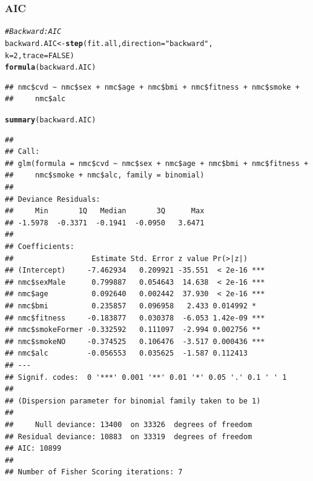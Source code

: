 \documentclass{article}\usepackage[]{graphicx}\usepackage[]{xcolor}
\makeatletter
\newcommand{\hlnum}[1]{\textcolor[rgb]{0.686,0.059,0.569}{#1}}%
\newcommand{\hlstr}[1]{\textcolor[rgb]{0.192,0.494,0.8}{#1}}%
\newcommand{\hlcom}[1]{\textcolor[rgb]{0.678,0.584,0.686}{\textit{#1}}}%
\newcommand{\hlstd}[1]{\textcolor[rgb]{0.345,0.345,0.345}{#1}}%
\newcommand{\hlkwb}[1]{\textcolor[rgb]{0.69,0.353,0.396}{#1}}%
\newcommand{\hlkwc}[1]{\textcolor[rgb]{0.333,0.667,0.333}{#1}}%
\newcommand{\hlkwd}[1]{\textcolor[rgb]{0.737,0.353,0.396}{\textbf{#1}}}%
\newenvironment{kframe}{%
 \def\at@end@of@kframe{}%
 \ifinner\ifhmode%
  \def\at@end@of@kframe{\end{minipage}}%
  \begin{minipage}{\columnwidth}%
 \fi\fi%
 \def\FrameCommand##1{\hskip\@totalleftmargin \hskip-\fboxsep
 \colorbox{shadecolor}{##1}\hskip-\fboxsep
     \hskip-\linewidth \hskip-\@totalleftmargin \hskip\columnwidth}%
 \MakeFramed {\advance\hsize-\width
   \@totalleftmargin\z@ \linewidth\hsize
   \@setminipage}}%
 {\par\unskip\endMakeFramed%
 \at@end@of@kframe}
\newenvironment{knitrout}{}{} %
\makeatother
\begin{document}
        \subsubsection{AIC}
\begin{knitrout}
\color{fgcolor}\begin{kframe}
\begin{alltt}
\hlcom{#Backward: AIC}
\hlstd{backward.AIC} \hlkwb{<-} \hlkwd{step}\hlstd{(fit.all,} \hlkwc{direction}\hlstd{=}\hlstr{"backward"}\hlstd{,}
                     \hlkwc{k}\hlstd{=}\hlnum{2}\hlstd{,} \hlkwc{trace}\hlstd{=}\hlnum{FALSE}\hlstd{)}
\hlkwd{formula}\hlstd{(backward.AIC)}
\end{alltt}
\begin{verbatim}
## nmc$cvd ~ nmc$sex + nmc$age + nmc$bmi + nmc$fitness + nmc$smoke + 
##     nmc$alc
\end{verbatim}
\begin{alltt}
\hlkwd{summary}\hlstd{(backward.AIC)}
\end{alltt}
\begin{verbatim}
## 
## Call:
## glm(formula = nmc$cvd ~ nmc$sex + nmc$age + nmc$bmi + nmc$fitness + 
##     nmc$smoke + nmc$alc, family = binomial)
## 
## Deviance Residuals: 
##     Min       1Q   Median       3Q      Max  
## -1.5978  -0.3371  -0.1941  -0.0950   3.6471  
## 
## Coefficients:
##                  Estimate Std. Error z value Pr(>|z|)    
## (Intercept)     -7.462934   0.209921 -35.551  < 2e-16 ***
## nmc$sexMale      0.799887   0.054643  14.638  < 2e-16 ***
## nmc$age          0.092640   0.002442  37.930  < 2e-16 ***
## nmc$bmi          0.235857   0.096958   2.433 0.014992 *  
## nmc$fitness     -0.183877   0.030378  -6.053 1.42e-09 ***
## nmc$smokeFormer -0.332592   0.111097  -2.994 0.002756 ** 
## nmc$smokeNO     -0.374525   0.106476  -3.517 0.000436 ***
## nmc$alc         -0.056553   0.035625  -1.587 0.112413    
## ---
## Signif. codes:  0 '***' 0.001 '**' 0.01 '*' 0.05 '.' 0.1 ' ' 1
## 
## (Dispersion parameter for binomial family taken to be 1)
## 
##     Null deviance: 13400  on 33326  degrees of freedom
## Residual deviance: 10883  on 33319  degrees of freedom
## AIC: 10899
## 
## Number of Fisher Scoring iterations: 7
\end{verbatim}
\end{kframe}
\end{knitrout}
          
\end{document}
